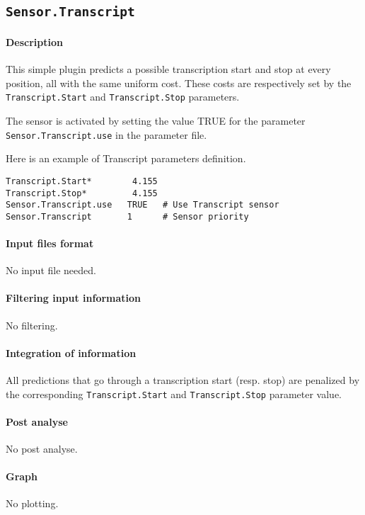 
\subsection{\texttt{Sensor.Transcript}}

\paragraph{Description}

This simple plugin predicts a possible transcription start and stop at
every position, all with the same uniform cost. These costs are
respectively set by the \texttt{Transcript.Start} and
\texttt{Transcript.Stop} parameters.

The sensor is activated by setting the value TRUE for the parameter
\texttt{Sensor.Transcript.use} in the parameter file. 

Here is an example of Transcript parameters definition.
\begin{Verbatim}[fontsize=\small]
Transcript.Start*        4.155
Transcript.Stop*         4.155
Sensor.Transcript.use   TRUE   # Use Transcript sensor
Sensor.Transcript       1      # Sensor priority
\end{Verbatim}

\paragraph{Input files format}

No input file needed.

\paragraph{Filtering input information}

No filtering.

\paragraph{Integration of information}

All predictions that go through a transcription start (resp. stop) are
penalized by the corresponding \texttt{Transcript.Start} and
\texttt{Transcript.Stop} parameter value.

\paragraph{Post analyse}

No post analyse.

\paragraph{Graph}

No plotting.




